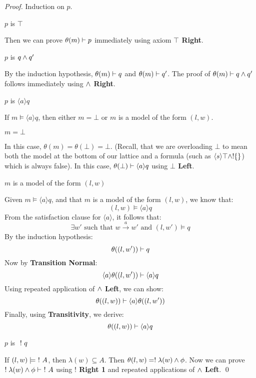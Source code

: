 \begin{proof}
Induction on $p$.
\setcounter{mycase}{0}

\begin{mycase}
$p$ is $\top$
\end{mycase}
Then we can prove  $\theta(m) \vdash p$ immediately using axiom {\bf $\top$ Right}.

\begin{mycase}
$p$ is $q \land q'$
\end{mycase}
By the induction hypothesis, $\theta(m) \vdash q$ and $\theta(m) \vdash q'$.
The proof of $\theta(m) \vdash q \land q'$ follows immediately using {\bf $\land$ Right}.

\begin{mycase}
$p$ is $\langle a \rangle q$
\end{mycase}
If $m \models \langle a \rangle q$, then either $m = \bot$ or $m$ is a  model of the form $(l,w)$.
\begin{subcase}
$m = \bot$
\end{subcase}
In this case, $\theta(m) = \theta(\bot) = \bot$. (Recall, that we are overloading $\bot$ to mean both the  model at the bottom of our lattice and a formula (such as $\langle s \rangle \top \land !\{\}$) which is always false).
In this case, $ \theta(\bot) \vdash  \langle a \rangle q$ using {\bf $\bot$ Left}.

\begin{subcase}
 $m$ is a  model of the form $(l,w)$
 \end{subcase}
Given $m \models \langle a \rangle q$, and that $m$ is a  model of the form $(l,w)$, we know that:
\[
(l,w) \models \langle a \rangle q
\]
From the satisfaction clause for $\langle a \rangle$, it follows that:
\[
\exists w' \mbox{ such that } w \xrightarrow{a} w' \mbox { and } (l,w') \models q
\]
By the induction hypothesis:
\[
\theta( (l,w') ) \vdash q
\]
Now by {\bf Transition Normal}:
\[
\langle a \rangle \theta( (l,w') ) \vdash \langle a \rangle q
\]
Using repeated application of {\bf $\land$ Left}, we can show:
\[
\theta((l,w)) \vdash \langle a \rangle \theta((l,w'))
\]
Finally, using {\bf Transitivity}, we derive:
\[
\theta((l,w)) \vdash  \langle a \rangle q
\]
\begin{mycase}
$p$ is $\ ! \  q$
\end{mycase}
If $(l,w) \models \ ! \  A$, then $\lambda(w) \subseteq A$.
Then $\theta(l,w) = ! \; \lambda(w) \land \phi$.
Now we can prove $! \; \lambda(w) \land \phi \vdash \ ! \  A$ using  {\bf $!$ Right 1} and repeated applications of {\bf $\land$ Left}.
\qed
\end{proof}

